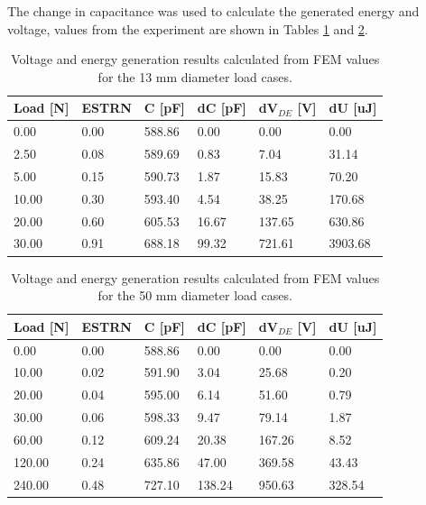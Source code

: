 The change in capacitance was used to calculate the generated energy and voltage, values from the experiment are shown in Tables \ref{tab:volt-energy-gen-d13mm} and \ref{tab:volt-energy-gen-50mm}.

\begin{table}[H]
	\centering
	\caption{Voltage and energy generation results calculated from FEM values for the 13 mm diameter load cases.}
	\label{tab:volt-energy-gen-d13mm}
	\vspace{0.3cm}
	\begin{tabular}{llllll}
		\textbf{Load [N]} & \textbf{ESTRN} & \textbf{C [pF]} & \textbf{dC [pF]} & \textbf{dV$_{DE}$ [V]} & \textbf{dU [uJ]} \\ \hline
		0.00  & 0.00 & 588.86 & 0.00  & 0.00   & 0.00    \\
		2.50  & 0.08 & 589.69 & 0.83  & 7.04   & 31.14   \\
		5.00  & 0.15 & 590.73 & 1.87  & 15.83  & 70.20   \\
		10.00 & 0.30 & 593.40 & 4.54  & 38.25  & 170.68  \\
		20.00 & 0.60 & 605.53 & 16.67 & 137.65 & 630.86  \\
		30.00 & 0.91 & 688.18 & 99.32 & 721.61 & 3903.68
	\end{tabular}
\end{table}

\begin{table}[H]
	\centering
	\caption{Voltage and energy generation results calculated from FEM values for the 50 mm diameter load cases.}
	\label{tab:volt-energy-gen-50mm}
	\vspace{0.3cm}
	\begin{tabular}{llllll}
		\textbf{Load [N]} & \textbf{ESTRN} & \textbf{C [pF]} & \textbf{dC [pF]} & \textbf{dV$_{DE}$ [V]} & \textbf{dU [uJ]} \\ \hline
		0.00 & 0.00 & 588.86 & 0.00 & 0.00 & 0.00 \\
		10.00 & 0.02 & 591.90 & 3.04 & 25.68 & 0.20 \\
		20.00 & 0.04 & 595.00 & 6.14 & 51.60 & 0.79 \\
		30.00 & 0.06 & 598.33 & 9.47 & 79.14 & 1.87 \\
		60.00 & 0.12 & 609.24 & 20.38 & 167.26 & 8.52 \\
		120.00 & 0.24 & 635.86 & 47.00 & 369.58 & 43.43 \\
		240.00 & 0.48 & 727.10 & 138.24 & 950.63 & 328.54
	\end{tabular}
\end{table}


